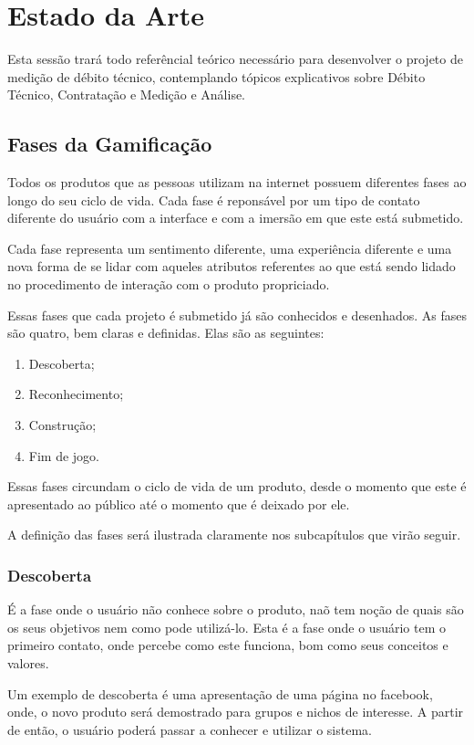 \chapter[Estado da Arte]{Estado da Arte}
Esta sessão trará todo referêncial teórico necessário para desenvolver o projeto 
de medição de débito técnico, contemplando tópicos explicativos sobre Débito Técnico,
Contratação e Medição e Análise.

\section{Fases da Gamificação}
\label{sub:fasesgamification}
Todos os produtos que as pessoas utilizam na internet possuem diferentes
fases ao longo do seu ciclo de vida. Cada fase é reponsável por um tipo de contato diferente 
do usuário com a interface e com a imersão em que este está submetido.

Cada fase representa um sentimento diferente, uma experiência diferente
e uma nova forma de se lidar com aqueles atributos referentes ao que está
sendo lidado no procedimento de interação com o produto propriciado.

Essas fases que cada projeto é submetido já são conhecidos e desenhados. As fases
são quatro, bem claras e definidas. Elas são as seguintes:

\begin{enumerate}
    \item Descoberta;
    \item Reconhecimento;
    \item Construção;
    \item Fim de jogo.
\end{enumerate}

Essas fases circundam o ciclo de vida de um produto, desde o momento que este
é apresentado ao público até o momento que é deixado por ele. 

A definição das fases será ilustrada claramente nos subcapítulos que virão seguir.

\subsection{Descoberta}
\label{sub:descoperta}
É a fase onde o usuário não conhece sobre o produto, naõ tem noção de quais são 
os
seus objetivos nem como pode utilizá-lo. Esta é a fase onde o usuário tem o primeiro
contato, onde percebe como este funciona, bom como seus conceitos e valores.

Um exemplo de descoberta é uma apresentação de uma página no facebook, onde,
o novo produto será demostrado para grupos e nichos de interesse. A partir
de então, o usuário poderá passar a conhecer e utilizar o sistema.

